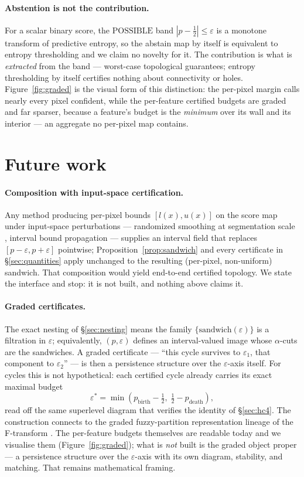 \documentclass[10pt]{article}
\newcommand{\POSS}{\mathrm{POSSIBLE}}
\newcommand{\eps}{\varepsilon}
\begin{document}
\paragraph{Abstention is not the contribution.} For a scalar binary
score, the $\POSS$ band $|p - \tfrac12| \le \eps$ is a monotone transform
of predictive entropy, so the abstain map by itself is equivalent to
entropy thresholding and we claim no novelty for it. The contribution is
what is \emph{extracted} from the band --- worst-case topological
guarantees; entropy thresholding by itself certifies nothing about
connectivity or holes. Figure~\ref{fig:graded} is the visual form of this
distinction: the per-pixel margin calls nearly every pixel confident, while
the per-feature certified budgets are graded and far sparser, because a
feature's budget is the \emph{minimum} over its wall and its interior --- an
aggregate no per-pixel map contains.

\section{Future work}\label{sec:future}

\paragraph{Composition with input-space certification.} Any method
producing per-pixel bounds $[l(x),u(x)]$ on the score map under
input-space perturbations --- randomized smoothing at segmentation scale
\citep{fischer2021segcert}, interval bound propagation
\citep{gowal2018ibp} --- supplies an interval field that replaces
$[p-\eps,p+\eps]$ pointwise; Proposition~\ref{prop:sandwich} and every
certificate in \S\ref{sec:quantities} apply unchanged to the resulting
(per-pixel, non-uniform) sandwich. That composition would yield end-to-end
certified topology. We state the interface and stop: it is not built, and
nothing above claims it.

\paragraph{Graded certificates.} The exact nesting of \S\ref{sec:nesting}
means the family $\{\text{sandwich}(\eps)\}$ is a filtration in $\eps$;
equivalently, $(p,\eps)$ defines an interval-valued image whose
$\alpha$-cuts are the sandwiches. A graded certificate --- ``this cycle
survives to $\eps_1$, that component to $\eps_2$'' --- is then a
persistence structure over the $\eps$-axis itself. For cycles this is not
hypothetical: each certified cycle already carries its exact maximal
budget
\[
  \eps^{*} = \min\!\left(p_{\mathrm{birth}} - \tfrac12,\; \tfrac12 -
  p_{\mathrm{death}}\right),
\]
read off the same superlevel diagram that verifies
the identity of \S\ref{sec:hc4}. The construction connects to the graded
fuzzy-partition representation lineage of the F-transform
\citep{perfilieva2006ftransform}. The per-feature
budgets themselves are readable today and we visualise them
(Figure~\ref{fig:graded}); what is \emph{not} built is the graded object
proper --- a persistence structure over the $\eps$-axis with its own
diagram, stability, and matching. That remains mathematical framing.
\end{document}
